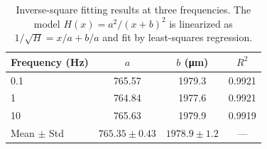 \begin{table}[htbp]
\centering
\caption{Inverse-square fitting results at three frequencies. The model
$H(x) = a^2/(x+b)^2$ is linearized as $1/\sqrt{H} = x/a + b/a$ and
fit by least-squares regression.}
\label{tab:fit-results}
\begin{tabular}{@{}lccc@{}}
\toprule
Frequency (Hz) & $a$ & $b$ (\si{\um}) & $R^2$ \\
\midrule
0.1  & 765.57 & 1979.3 & 0.9921 \\
1    & 764.84 & 1977.6 & 0.9921 \\
10   & 765.63 & 1979.9 & 0.9919 \\
\midrule
Mean $\pm$ Std & $765.35 \pm 0.43$ & $1978.9 \pm 1.2$ & --- \\
\bottomrule
\end{tabular}
\end{table}
